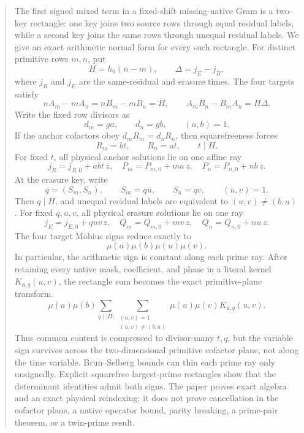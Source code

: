 \begin{abstract}
The first signed mixed term in a fixed-shift missing-native Gram is a
two-key rectangle: one key joins two source rows through equal residual
labels, while a second key joins the same rows through unequal residual
labels.  We give an exact arithmetic normal form for every such rectangle.
For distinct primitive rows \(m,n\), put
\[
 H=h_0(n-m),\qquad \Delta=j_E-j_R,
\]
where \(j_R\) and \(j_E\) are the same-residual and erasure times.  The four
targets satisfy
\[
 nA_m-mA_n=nB_m-mB_n=H,\qquad
 A_mB_n-B_mA_n=H\Delta.
\]
Write the fixed row divisors as
\[
 d_m=ga,\qquad d_n=gb,\qquad (a,b)=1.
\]
If the anchor cofactors obey \(d_mR_m=d_nR_n\), then squarefreeness forces
\[
 R_m=bt,\qquad R_n=at,\qquad t\mid H.
\]
For fixed \(t\), all physical anchor solutions lie on one affine ray
\[
 j_R=j_{R,0}+abt\,z,\quad
 P_m=P_{m,0}+ma\,z,\quad
 P_n=P_{n,0}+nb\,z.
\]
At the erasure key, write
\[
 q=(S_m,S_n),\qquad S_m=qu,\qquad S_n=qv,\qquad (u,v)=1.
\]
Then \(q\mid H\), and unequal residual labels are equivalent to
\((u,v)\ne(b,a)\).  For fixed \(q,u,v\), all physical erasure solutions lie
on one ray
\[
 j_E=j_{E,0}+quv\,z,\quad
 Q_m=Q_{m,0}+mv\,z,\quad
 Q_n=Q_{n,0}+nu\,z.
\]
The four target M\"obius signs reduce exactly to
\[
 \mu(a)\mu(b)\mu(u)\mu(v).
\]
In particular, the arithmetic sign is constant along each prime ray.
After retaining every native mask, coefficient, and phase in a literal
kernel \(K_{\mathfrak a,q}(u,v)\), the rectangle sum becomes the exact
primitive-plane transform
\[
 \mu(a)\mu(b)
 \sum_{q\mid |H|}
 \sum_{\substack{(u,v)=1\\(u,v)\ne(b,a)}}
 \mu(u)\mu(v)K_{\mathfrak a,q}(u,v).
\]
Thus common content is compressed to divisor-many \(t,q\), but the
variable sign survives across the two-dimensional primitive cofactor
plane, not along the time variable.  Brun--Selberg bounds can thin each
prime ray only unsignedly.  Explicit squarefree largest-prime rectangles
show that the determinant identities admit both signs.  The paper proves
exact algebra and an exact physical reindexing; it does not prove
cancellation in the cofactor plane, a native operator bound, parity
breaking, a prime-pair
theorem, or a twin-prime result.
\end{abstract}
